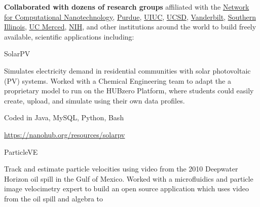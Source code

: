 \documentclass[10pt]{article}
\begin{document}
\begin{outerlist}
\begin{innerlist}
            \item \textbf{Collaborated with dozens of research groups} affiliated with the
                \href{https://nanohub.org/groups/ncn}{Network for Computational Nanotechnology},
                \href{https://engineering.purdue.edu/ChE/People/ptProfile?id=12436}{Purdue},
                \href{http://nanobionode.illinois.edu}{UIUC},
                \href{http://pegasus.isi.edu}{UCSD},
                \href{http://telab.vuse.vanderbilt.edu/greg.walker}{Vanderbilt},
                \href{http://www.engr.siu.edu/staff1/ahmed/mywebpage/ahmed.html}{Southern Illinois},
                \href{http://faculty1.ucmerced.edu/amartini}{UC Merced},
                \href{http://cbiit.nci.nih.gov/ncip}{NIH},
                and other institutions around the world to build freely available,
                scientific applications including:
                \begin{outerlist}
                    \item[] SolarPV
                        \begin{innerlist}
                            \item[] Simulates electricity demand in residential
                              communities with solar photovoltaic (PV) systems.
                              Worked with a Chemical Engineering team to adapt
                              the a proprietary model to run on the HUBzero
                              Platform, where students could easily create,
                              upload, and simulate using their own data profiles.
                            \item[] Coded in Java, MySQL, Python, Bash
                            \item[] \url{https://nanohub.org/resources/solarpv} \hfill{}
                        \end{innerlist}
                    \item[] ParticleVE
                        \begin{innerlist}
                            \item[] Track and estimate particle velocities
                              using video from the 2010 Deepwater Horizon
                              oil spill in the Gulf of Mexico. Worked with
                              a microfluidics and particle image velocimetry
                              expert to build an open source application which
                              uses video from the oil spill and algebra to

\end{innerlist}
\end{outerlist}
\end{innerlist}
\end{outerlist}
\end{document}
